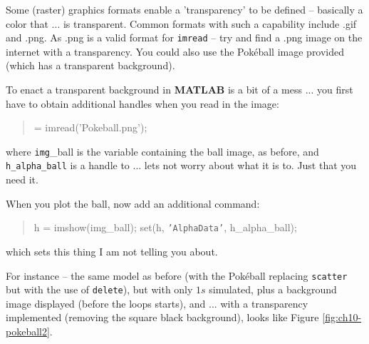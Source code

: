 \documentclass{tufte-book} %
\newenvironment{docspec}{\begin{quotation}\ttfamily\parskip0pt\parindent0pt\ignorespaces}{\end{quotation}}
\begin{document}
Some (raster) graphics formats enable a 'transparency' to be defined -- basically a color that ... is transparent. Common formats with such a capability include \textsf{.gif} and \textsf{.png}. As \textsf{.png} is a valid format for \texttt{imread} -- try and find a \textsf{.png} image on the internet with a transparency. You could also use the Pok\'eball image provided (which has a transparent background).

To enact a transparent background in \textbf{MATLAB} is a bit of a mess ... you first have to obtain additional handles when you read in the image:
\begin{docspec}
[img\_ball, h\_map\_ball, h\_alpha\_ball] = imread(\textcolor[rgb]{1,0,1}{'Pokeball.png'});
\end{docspec}
where \texttt{img}\_ball is the variable containing the ball image, as before, and \texttt{h\_alpha\_ball} is a handle to ... lets not worry about what it is to. Just that you need it.

When you plot the ball, now add an additional command:
\begin{docspec}
    h = imshow(img\_ball);
    set(h, \texttt{'AlphaData'}, h\_alpha\_ball);
\end{docspec}
which sets this thing I am not telling you about.

For instance -- the same model as before (with the Pok\'eball replacing \texttt{scatter} but with the use of \texttt{delete}), but with only \(1s\) simulated, plus a background image displayed (before the loops starts), and ... with a transparency implemented (removing the square black background), looks like Figure \ref{fig:ch10-pokeball2}.
\end{document}
